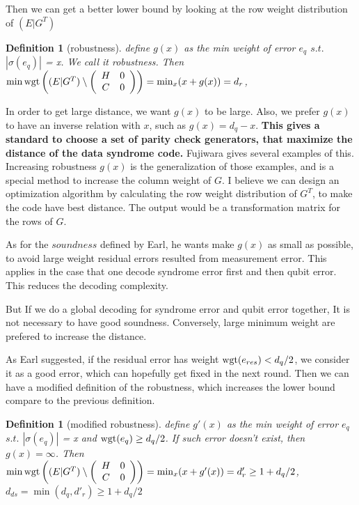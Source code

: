 \documentclass[aps,prb,12pt,tightenlines,%
notitlepage,longbibliography]{revtex4-1}
\newtheorem{definition}[theorem]{Definition}
\begin{document}
Then we can get a better lower bound by looking at the row weight distribution of $(E|G^T)$

\begin{definition}[robustness] 
define $g(x)$ as the min weight of error $e_q$ $s.t.$ $|\sigma (e_q) |$ = x. We call it robustness. Then 
$\min \mathop{\rm wgt} \left( (E|G^T) 
\setminus \left( \begin{array}{cc} H & 0 \\ C & 0 \end{array} \right) \right)
=\min_x (x+g(x))=d_r$, 
\end{definition}
In order to get large distance, we want $g(x)$ to be large. Also, we prefer $g(x)$ to have an inverse relation with $x$, such as $g(x)=d_q-x$.
\textbf{ This gives a standard to choose a set of parity check generators, that maximize the distance of the data syndrome code.} Fujiwara \cite{fujiwara2014ability} gives several examples of this. Increasing robustness $g(x)$ is the generalization of those examples, and is a special method to increase the column weight of $G$. I believe we can design an optimization algorithm by calculating the row weight distribution of $G^T$, to make the code have best distance. The output would be a transformation matrix for the rows of $G$.

As for the $soundness$ defined by Earl, he wants make $g(x)$ as small as possible, to avoid large weight residual errors resulted from measurement error. This applies in the case that one decode syndrome error first and then qubit error. This reduces the decoding complexity.

But If we do a global decoding for syndrome error and qubit error together, It is not necessary to have good soundness. Conversely, large minimum weight are prefered to increase the distance.

As Earl suggested, if the residual error has weight $\mathop{\rm wgt}(e_{res})<d_q/2$, we consider it as a good error, which can hopefully get fixed in the next round. Then we can have a modified definition of the robustness, which increases the lower bound compare to the previous definition.

\begin{definition}[modified robustness] 
define $g'(x)$ as the min weight of error $e_q$ $s.t.$ $|\sigma (e_q) |$ = x and $\mathop{\rm wgt}(e_q) \ge d_q/2$. If such error doesn't exist, then $g(x)=\infty$.
Then 
$\min \mathop{\rm wgt} \left( (E|G^T) 
\setminus \left( \begin{array}{cc} H & 0 \\ C & 0 \end{array} \right) \right)
=\min_x (x+g'(x))=d'_r \ge 1+d_q/2$, $d_{ds}=\min ( d_q,d'_r) \ge 1+d_q/2$
\end{definition}
\end{document}
